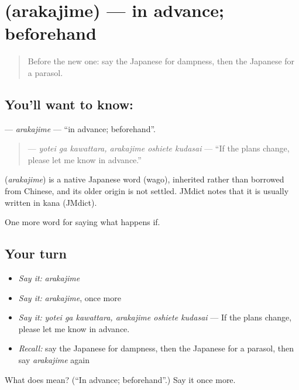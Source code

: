 \section[\texorpdfstring{\ja{あらかじめ} (arakajime)}{あらかじめ (arakajime)}]{ (arakajime) — in advance; beforehand}

\label{lesson:JA-C354-arakajime}



\begin{quote}
Before the new one: say the Japanese for dampness, then the Japanese for a parasol.
\end{quote}

\subsection*{You'll want to know: }
\textbf{} — \emph{arakajime} — \textquotedblleft{}in advance; beforehand\textquotedblright{}.

\begin{quote}
\textbf{   } — \emph{yotei ga kawattara, arakajime oshiete kudasai} — \textquotedblleft{}If the plans change, please let me know in advance.\textquotedblright{}
\end{quote}

\begin{cousinweb}
\textbf{} (\emph{arakajime}) is a native Japanese word (wago), inherited rather than borrowed from Chinese, and its older origin is not settled. JMdict notes that it is usually written in kana (JMdict).
\end{cousinweb}

\begin{grammarlens}[title={What you've built}]
One more word for saying what happens if.
\end{grammarlens}

\subsection*{Your turn}
\begin{itemize}
\raggedright
  \item \emph{Say it:} \emph{arakajime}
  \item \emph{Say it:} \emph{arakajime}, once more
  \item \emph{Say it:} \emph{yotei ga kawattara, arakajime oshiete kudasai} — If the plans change, please let me know in advance.
  \item \emph{Recall:} say the Japanese for dampness, then the Japanese for a parasol, then say \emph{arakajime} again
\end{itemize}

\begin{tcolorbox}[breakable,colback=teal!4,colframe=teal!35!black,title={Before you move on}]
What does  mean? (\textquotedblleft{}In advance; beforehand\textquotedblright{}.) Say it once more.
\end{tcolorbox}
